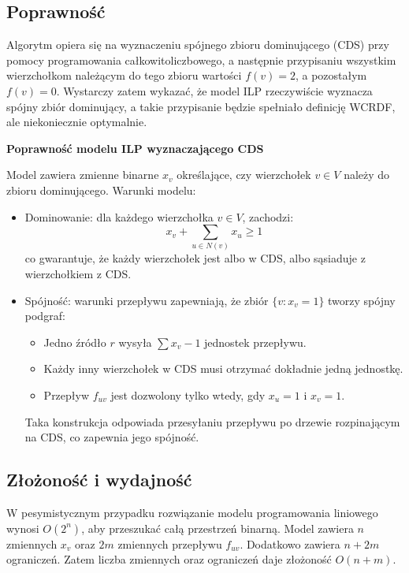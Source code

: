 \subsection{Poprawność}

Algorytm opiera się na wyznaczeniu spójnego zbioru dominującego (CDS) przy pomocy programowania całkowitoliczbowego, a następnie przypisaniu wszystkim wierzchołkom należącym do tego zbioru wartości \( f(v) = 2 \), a pozostałym \( f(v) = 0 \). Wystarczy zatem wykazać, że model ILP rzeczywiście wyznacza spójny zbiór dominujący, a takie przypisanie będzie spełniało definicję WCRDF, ale niekoniecznie optymalnie.

\textbf{Poprawność modelu ILP wyznaczającego CDS}

Model zawiera zmienne binarne \( x_v \) określające, czy wierzchołek \( v \in V \) należy do zbioru dominującego. Warunki modelu:

\begin{itemize}
    \item Dominowanie: dla każdego wierzchołka \( v \in V \), zachodzi:
    \[
    x_v + \sum_{u \in N(v)} x_u \geq 1
    \]
    co gwarantuje, że każdy wierzchołek jest albo w CDS, albo sąsiaduje z wierzchołkiem z CDS.

    \item Spójność: warunki przepływu zapewniają, że zbiór \( \{v : x_v = 1\} \) tworzy spójny podgraf:
    \begin{itemize}
        \item Jedno źródło  \( r \) wysyła \( \sum x_v - 1 \) jednostek przepływu.
        \item Każdy inny wierzchołek w CDS musi otrzymać dokładnie jedną jednostkę.
        \item Przepływ \( f_{uv} \) jest dozwolony tylko wtedy, gdy \( x_u = 1 \) i \( x_v = 1 \).
    \end{itemize}
    Taka konstrukcja odpowiada przesyłaniu przepływu po drzewie rozpinającym na CDS, co zapewnia jego spójność.
\end{itemize}

\subsection{Złożoność i wydajność}

W pesymistycznym przypadku rozwiązanie modelu programowania liniowego wynosi $O(2^n)$, aby przeszukać całą przestrzeń binarną. Model zawiera $n$ zmiennych $x_v$ oraz $2m$ zmiennych przepływu $f_{uv}$. Dodatkowo zawiera $n + 2m$ ograniczeń. Zatem liczba zmiennych oraz ograniczeń daje złożoność $O(n+m)$.


